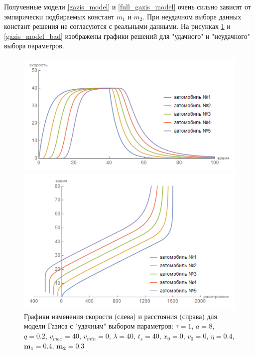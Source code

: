 \documentclass[12pt, a4paper]{extarticle}
\numberwithin{equation}{section}
\begin{document}
Полученные модели \eqref{gazis_model} и \eqref{full_gazis_model} очень сильно зависят от эмпирически подбираемых констант $m_1$ и $m_2$. При неудачном выборе данных констант решения не согласуются с реальными данными. На рисунках \ref{gazis_model_good} и \ref{gazis_model_bad} изображены графики решений для "удачного" и "неудачного" выбора параметров. 
\begin{figure}[h!]
	\begin{center}
		\begin{minipage}[h!]{0.48\linewidth}
			\includegraphics[width=1\linewidth,height=0.2\textheight]
			{Images/gazis_model_good_speed.png}
		\end{minipage}
		\hfill 
		\begin{minipage}[h!]{0.48\linewidth}
			\includegraphics[width=1\linewidth,height=0.2\textheight]
			{Images/gazis_model_good_distance.png}
		\end{minipage}
		\caption{Графики изменения скорости (слева) и расстояния (справа) для модели Газиса с "удачным" выбором параметров: $\tau=1$, $a=8$, $q=0.2$, $v_{max}=40$, $v_{min}=0$, $\lambda=40$, $t_s=40$, $x_0=0$, $v_0=0$, $\eta=0.4$, $\boldsymbol{m_1=0.4}$, $\boldsymbol{m_2=0.3}$}
		\label{gazis_model_good}
	\end{center}
\end{figure}
\end{document}
